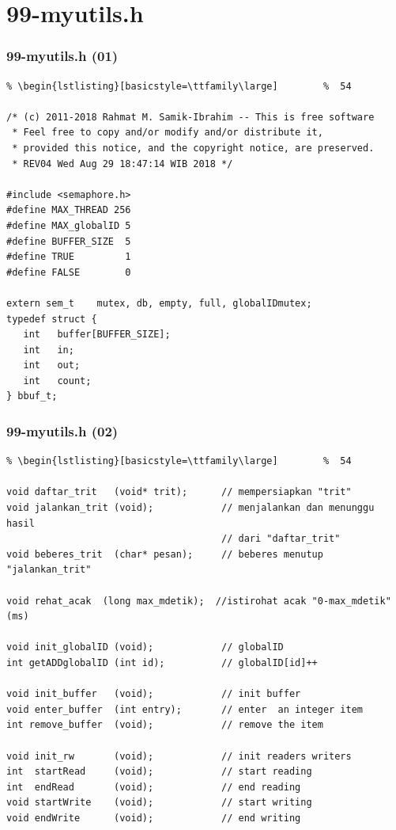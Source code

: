 \documentclass[aspectratio=169, xcolor=table, notheorems, hyperref={pdfpagelabels=false}]{beamer}
\begin{document}
\section{99-myutils.h}
\begin{frame}[fragile]
\frametitle{99-myutils.h (01)}
\begin{lstlisting}[basicstyle=\ttfamily\footnotesize] %  72
% \begin{lstlisting}[basicstyle=\ttfamily\small]        %  65
% \begin{lstlisting}[basicstyle=\ttfamily\large]        %  54

/* (c) 2011-2018 Rahmat M. Samik-Ibrahim -- This is free software
 * Feel free to copy and/or modify and/or distribute it, 
 * provided this notice, and the copyright notice, are preserved. 
 * REV04 Wed Aug 29 18:47:14 WIB 2018 */

#include <semaphore.h>
#define MAX_THREAD 256
#define MAX_globalID 5
#define BUFFER_SIZE  5
#define TRUE         1
#define FALSE        0

extern sem_t    mutex, db, empty, full, globalIDmutex;
typedef struct {
   int   buffer[BUFFER_SIZE];
   int   in;
   int   out;
   int   count;
} bbuf_t;

\end{lstlisting}
\end{frame}

\begin{frame}[fragile]
\frametitle{99-myutils.h (02)}
\begin{lstlisting}[basicstyle=\ttfamily\footnotesize] %  72
% \begin{lstlisting}[basicstyle=\ttfamily\small]        %  65
% \begin{lstlisting}[basicstyle=\ttfamily\large]        %  54

void daftar_trit   (void* trit);      // mempersiapkan "trit"
void jalankan_trit (void);            // menjalankan dan menunggu hasil 
                                      // dari "daftar_trit"
void beberes_trit  (char* pesan);     // beberes menutup "jalankan_trit"

void rehat_acak  (long max_mdetik);  //istirohat acak "0-max_mdetik"(ms)

void init_globalID (void);            // globalID
int getADDglobalID (int id);          // globalID[id]++

void init_buffer   (void);            // init buffer
void enter_buffer  (int entry);       // enter  an integer item 
int remove_buffer  (void);            // remove the item

void init_rw       (void);            // init readers writers
int  startRead     (void);            // start reading
int  endRead       (void);            // end reading
void startWrite    (void);            // start writing
void endWrite      (void);            // end writing

\end{lstlisting}
\end{frame}
\end{document}
